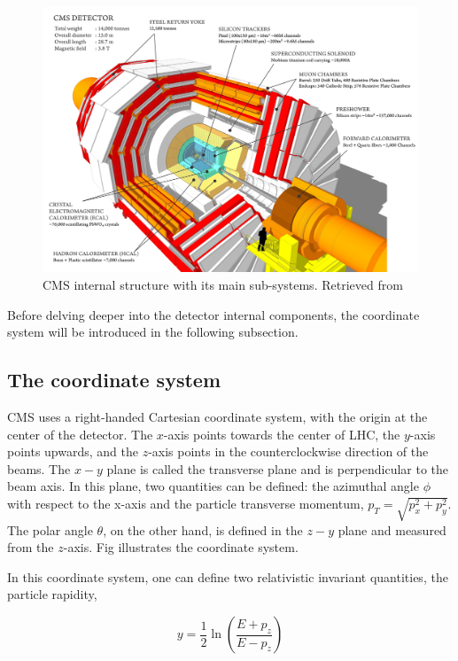 \begin{figure}[htp!]
	\centering
	\includegraphics[scale=0.2]{MainContent/Figs/cms_structure.png}
	\caption{CMS internal structure with its main sub-systems. Retrieved from }
	\label{fig:CMS_structure}
\end{figure}


Before delving deeper into the detector internal components, the coordinate system will be introduced in the following subsection.

\subsection{The coordinate system}
CMS uses a right-handed Cartesian coordinate system, with the origin at the center of the detector. The $x$-axis points towards the center of LHC, the $y$-axis points upwards, and the $z$-axis points in the counterclockwise direction of the beams. The $x-y$ plane is called the transverse plane and is perpendicular to the beam axis. In this plane, two quantities can be defined: the azimuthal angle $\phi$ with respect to the x-axis and the particle transverse momentum, $p_T = \sqrt{p_x^2 + p_y^2}$. The polar angle $\theta$, on the other hand, is defined in the $z-y$ plane and measured from the $z$-axis. Fig illustrates the coordinate system.

In this coordinate system, one can define two relativistic invariant quantities, the particle rapidity,

\begin{equation}
y = \frac{1}{2}\ln\left(\frac{E+p_z}{E-p_z}\right)
\end{equation}

